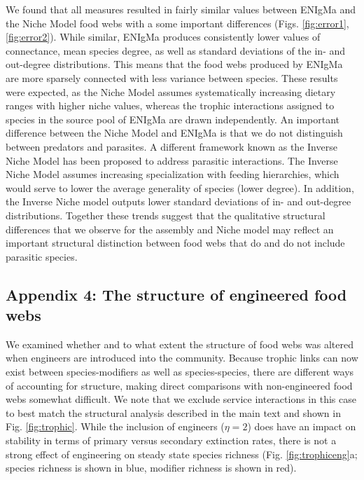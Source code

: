 \documentclass[twocolumn,preprintnumbers,amsmath,amssymb,superscriptaddress,linenumbers]{revtex4-1}
\begin{document}
We found that all measures resulted in fairly similar values between ENIgMa and the Niche Model food webs with a some important differences (Figs. \ref{fig:error1},\ref{fig:error2}).
While similar, ENIgMa produces consistently lower values of connectance, mean species degree, as well as standard deviations of the in- and out-degree distributions.
This means that the food webs produced by ENIgMa are more sparsely connected with less variance between species.
These results were expected, as the Niche Model assumes systematically increasing dietary ranges with higher niche values, whereas the trophic interactions assigned to species in the source pool of ENIgMa are drawn independently.
An important difference between the Niche Model and ENIgMa is that we do not distinguish between predators and parasites.
A different framework known as the Inverse Niche Model \cite{Warren2010} has been proposed to address parasitic interactions.
The Inverse Niche Model assumes increasing specialization with feeding hierarchies, which would serve to lower the average generality of species (lower degree).
In addition, the Inverse Niche model outputs lower standard deviations of in- and out-degree distributions.
Together these trends suggest that the qualitative structural differences that we observe for the assembly and Niche model may reflect an important structural distinction between food webs that do and do not include parasitic species.

\subsection*{Appendix 4: The structure of engineered food webs}
We examined whether and to what extent the structure of food webs was altered when engineers are introduced into the community.
Because trophic links can now exist between species-modifiers as well as species-species, there are different ways of accounting for structure, making direct comparisons with non-engineered food webs somewhat difficult.
We note that we exclude service interactions in this case to best match the structural analysis described in the main text and shown in Fig. \ref{fig:trophic}.
While the inclusion of engineers ($\eta = 2$) does have an impact on stability in terms of primary versus secondary extinction rates, there is not a strong effect of engineering on steady state species richness (Fig. \ref{fig:trophiceng}a; species richness is shown in blue, modifier richness is shown in red).
\end{document}

